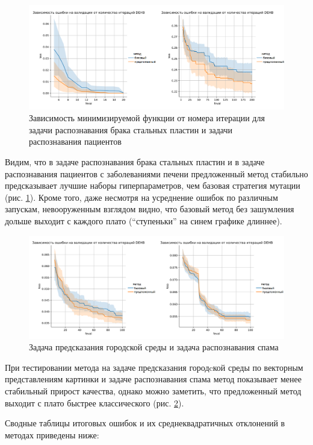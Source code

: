 \documentclass[a4paper,12pt]{article}
\begin{document}
\begin{figure}[h]
    \centering
    \includegraphics[width=12cm]{exp1.png}
    \caption{Зависимость минимизируемой функции от номера итерации для задачи распознавания брака стальных пластин и задачи распознавания пациентов}
    \label{fig:exp1}
\end{figure}
\par

Видим, что в задаче распознавания брака стальных пластин и в задаче распознавания пациентов с заболеваниями печени предложенный метод стабильно предсказывает лучшие наборы гиперпараметров, чем базовая стратегия мутации (рис. \ref{fig:exp1}). Кроме того, даже несмотря на усреднение ошибок по различным запускам, невооруженным взглядом видно, что базовый метод без зашумления дольше выходит с каждого плато (“ступеньки” на синем графике длиннее).

 
\begin{figure}[h]
    \centering
    \includegraphics[width=12cm]{exp2.png}
    \caption{Задача предсказания городской среды  и задача распознавания спама}
    \label{fig:exp2}
\end{figure}
\par
При тестировании метода на задаче предсказания городcкой среды по векторным представлениям картинки и задаче распознавания спама метод показывает менее стабильный прирост качества, однако можно заметить, что предложенный метод выходит с плато быстрее классического (рис. \ref{fig:exp2}).

\newpage
Сводные таблицы итоговых ошибок и их среднеквадратичных отклонений в методах приведены ниже:
\end{document}
